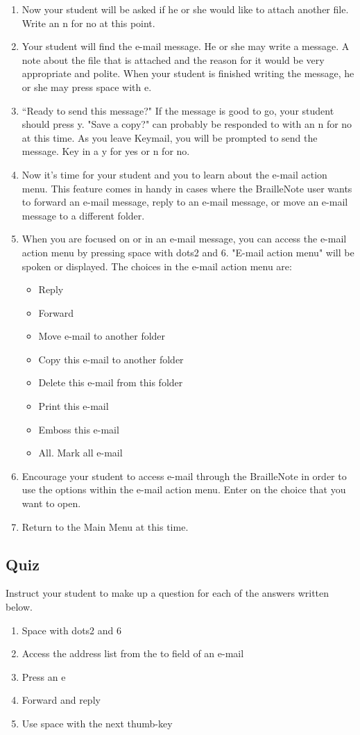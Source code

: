 \documentclass[10pt,letterpaper,twoside]{report}
\begin{document}
{{{\begin{enumerate}
	\item Now your student will be asked if he or she would like to attach another file.  Write an n for no at this point.
	\item Your student will find the e-mail message.  He or she may write a message.  A note about the file that is attached and the reason for it would be very appropriate and polite.  When your student is finished writing the message, he or she may press space with e.
	\item ``Ready to send this message?" If the message is good to go, your student should press y.  "Save a copy?" can probably be responded to with an n for no at this time.  As you leave Keymail, you will be prompted to send the message.  Key in a y for yes or n for no.
	\item Now it's time for your student and you to learn about the e-mail action menu.  This feature comes in handy in cases where the BrailleNote user wants to forward an e-mail message, reply to an e-mail message, or move an e-mail message to a different folder.
	\item When you are focused on or in an e-mail message, you can access the e-mail action menu by pressing space with dots2 and 6.  "E-mail action menu" will be spoken or displayed.  The choices in the e-mail action menu are:
	      \begin{itemize}
		      \item Reply
		      \item Forward
		      \item Move e-mail to another folder
		      \item Copy this e-mail to another folder
		      \item Delete this e-mail from this folder
		      \item Print this e-mail
		      \item Emboss this e-mail
		      \item All. Mark all e-mail
	      \end{itemize}
	\item Encourage your student to access e-mail through the BrailleNote in order to use the options within the e-mail action menu.  Enter on the choice that you want to open.
	\item Return to the Main Menu at this time.
\end{enumerate}
\clearpage
\subsection{Quiz}
Instruct your student to make up a question for each of the answers written below.
\begin{enumerate}
	\item Space with dots2 and 6
	\item Access the address list from the to field of an e-mail
	\item Press an e
	\item Forward and reply
	\item Use space with the next thumb-key
\end{enumerate}

}}}
\end{document}
